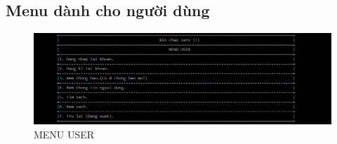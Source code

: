 \documentclass[16pt,a4paper,oneside]{article}
\begin{document}
\subsection{Menu dành cho người dùng}
\begin{figure}[htp]
	\begin{center}
		\includegraphics[width=18cm]{Images/menu_user.png}
		\caption{MENU USER}
	\end{center}
\end{figure}
\end{document}

